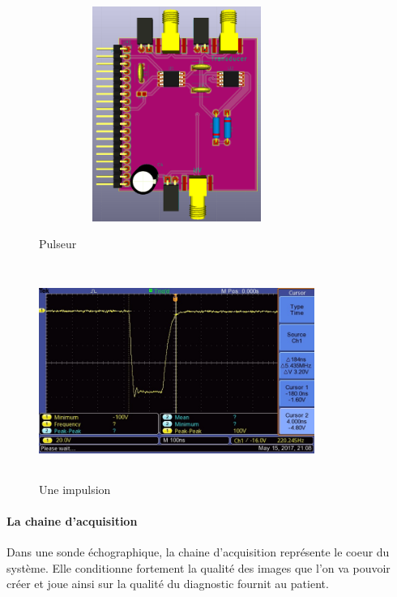 \documentclass[12pt]{article}
\begin{document}
\begin{figure}[!h]
  \hspace{-30pt}
  \vspace{30pt}
  \begin{minipage}[b]{0.45\linewidth}
   \centering
   \includegraphics[width=9cm,height=7cm]{Images_rapport/pulseur}  
   \caption{Pulseur}   
  \end{minipage}
\hfill
  \begin{minipage}[b]{0.45\linewidth}
   \centering
   \includegraphics[width=9cm,height=7cm]{Images_rapport/pulse}  
   \caption{Une impulsion}   
  \end{minipage}
\end{figure}





\newpage
\paragraph{La chaine d'acquisition}

Dans une sonde échographique, la chaine d'acquisition représente le coeur du système. Elle conditionne fortement la qualité des images que l'on va pouvoir créer et joue ainsi sur la qualité du diagnostic fournit au patient.
\end{document}
